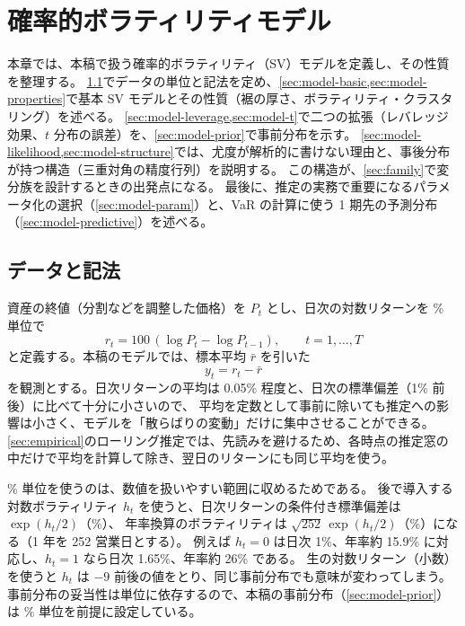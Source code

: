 \section{確率的ボラティリティモデル}\label{sec:model}

本章では、本稿で扱う確率的ボラティリティ（SV）モデルを定義し、その性質を整理する。
\cref{sec:model-data}でデータの単位と記法を定め、\cref{sec:model-basic,sec:model-properties}で基本 SV モデルとその性質（裾の厚さ、ボラティリティ・クラスタリング）を述べる。
\cref{sec:model-leverage,sec:model-t}で二つの拡張（レバレッジ効果、$t$ 分布の誤差）を、\cref{sec:model-prior}で事前分布を示す。
\cref{sec:model-likelihood,sec:model-structure}では、尤度が解析的に書けない理由と、事後分布が持つ構造（三重対角の精度行列）を説明する。
この構造が、\cref{sec:family}で変分族を設計するときの出発点になる。
最後に、推定の実務で重要になるパラメータ化の選択（\cref{sec:model-param}）と、VaR の計算に使う 1 期先の予測分布（\cref{sec:model-predictive}）を述べる。

\subsection{データと記法}\label{sec:model-data}

資産の終値（分割などを調整した価格）を $P_t$ とし、日次の対数リターンを \% 単位で
\[
  r_t = 100\,(\log P_t - \log P_{t-1}), \qquad t = 1, \dots, T
\]
と定義する。本稿のモデルでは、標本平均 $\bar r$ を引いた
\[
  y_t = r_t - \bar r
\]
を観測とする。日次リターンの平均は 0.05\% 程度と、日次の標準偏差（1\% 前後）に比べて十分に小さいので、
平均を定数として事前に除いても推定への影響は小さく、モデルを「散らばりの変動」だけに集中させることができる。
\cref{sec:empirical}のローリング推定では、先読みを避けるため、各時点の推定窓の中だけで平均を計算して除き、翌日のリターンにも同じ平均を使う。

\% 単位を使うのは、数値を扱いやすい範囲に収めるためである。
後で導入する対数ボラティリティ $h_t$ を使うと、日次リターンの条件付き標準偏差は $\exp(h_t/2)$（\%）、
年率換算のボラティリティは $\sqrt{252}\,\exp(h_t/2)$（\%）になる（1 年を 252 営業日とする）。
例えば $h_t = 0$ は日次 1\%、年率約 15.9\% に対応し、$h_t = 1$ なら日次 1.65\%、年率約 26\% である。
生の対数リターン（小数）を使うと $h_t$ は $-9$ 前後の値をとり、同じ事前分布でも意味が変わってしまう。
事前分布の妥当性は単位に依存するので、本稿の事前分布（\cref{sec:model-prior}）は \% 単位を前提に設定している。

